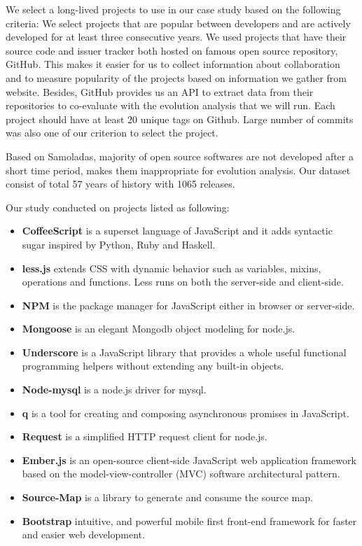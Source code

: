 We select a long-lived projects to use in our case study based on the following criteria:
We select projects that are popular between developers and are actively developed for at least three consecutive years.
	We used projects that have their source code and issuer tracker both hosted on famous open source repository, GitHub. This makes it easier for us to collect information about collaboration and to measure popularity of the projects based on information we gather from website. Besides, GitHub provides us an API to extract data from their repositories to co-evaluate with the evolution analysis that we will run. 
	Each project should have at least 20 unique tags on Github.
	Large number of commits was also one of our criterion to select the project.

Based on Samoladas\cite{Samoladas2010SAD}, majority of open source softwares are not developed after a short time period, makes them inappropriate for evolution analysis. Our dataset consist of total 
57 years of history with 1065 releases. 

Our study conducted on projects listed as following:
\begin{itemize}
	\item \textbf{CoffeeScript} is a superset language of JavaScript and it adds syntactic sugar inspired by Python, Ruby and Haskell.
	\item \textbf{less.js} extends CSS with dynamic behavior such as variables, mixins, operations and functions. Less runs on both the server-side and client-side.
	\item \textbf{NPM} is the package manager for JavaScript either in browser or server-side.
	\item \textbf {Mongoose} is an elegant Mongodb object modeling for node.js.
	\item \textbf{Underscore} is a JavaScript library that provides a whole useful functional programming helpers without extending any built-in objects.
	\item \textbf {Node-mysql} is a node.js driver for mysql.
	\item \textbf {q} is a tool for creating and composing asynchronous promises in JavaScript.
	\item \textbf {Request} is a simplified HTTP request client for node.js.
	\item \textbf{Ember.js} is an open-source client-side JavaScript web application framework based on the model-view-controller (MVC) software architectural pattern.
	\item \textbf{Source-Map} is a library to generate and consume the source map.
	\item \textbf{Bootstrap} intuitive, and powerful mobile first front-end framework for faster and easier web development.
\end{itemize} 

